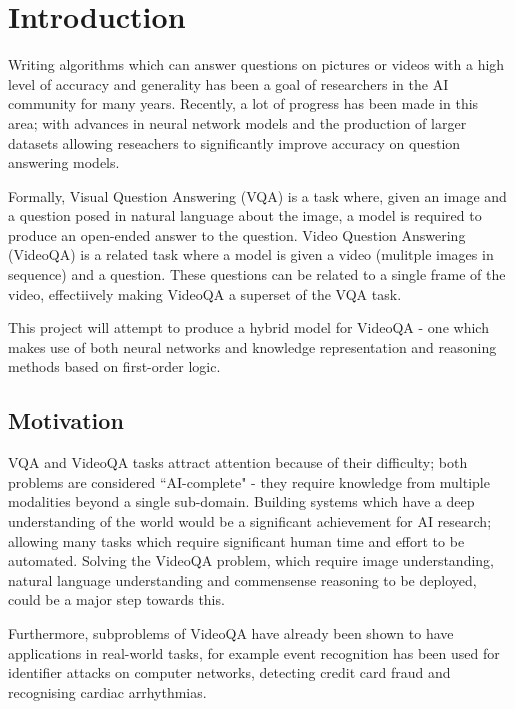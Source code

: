 \documentclass[../interim.tex]{subfiles}
\begin{document}
\section{Introduction}
\label{section:intro}

Writing algorithms which can answer questions on pictures or videos with a high level of accuracy and generality has been a goal of researchers in the AI community for many years. Recently, a lot of progress has been made in this area; with advances in neural network models and the production of larger datasets allowing reseachers to significantly improve accuracy on question answering models.

Formally, Visual Question Answering (VQA)\cite{vqa-intro} is a task where, given an image and a question posed in natural language about the image, a model is required to produce an open-ended answer to the question. Video Question Answering (VideoQA) is a related task where a model is given a video (mulitple images in sequence) and a question. These questions can be related to a single frame of the video, effectiively making VideoQA a superset of the VQA task.

This project will attempt to produce a hybrid model for VideoQA - one which makes use of both neural networks and knowledge representation and reasoning methods based on first-order logic. %


\subsection{Motivation}

VQA and VideoQA tasks attract attention because of their difficulty; both problems are considered ``AI-complete" - they require knowledge from multiple modalities beyond a single sub-domain\cite{def:ai-complete}. Building systems which have a deep understanding of the world would be a significant achievement for AI research; allowing many tasks which require significant human time and effort to be automated. Solving the VideoQA problem, which require image understanding, natural language understanding and commensense reasoning to be deployed, could be a major step towards this.

Furthermore, subproblems of VideoQA have already been shown to have applications in real-world tasks, for example event recognition has been used for identifier attacks on computer networks\cite{ED-uses:networks}, detecting credit card fraud\cite{ED-uses:fraud} and recognising cardiac arrhythmias\cite{ED-uses:cardiac}.
\end{document}
